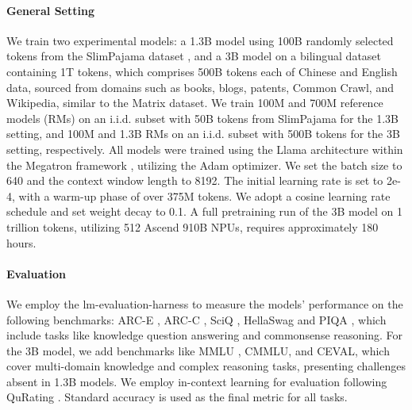 \documentclass[11pt]{article}
\begin{document}
\paragraph{General Setting} We train two experimental models: a 1.3B model using 100B randomly selected tokens from the SlimPajama dataset \cite{cerebras2023slimpajama}, and a 3B model on a bilingual dataset containing 1T tokens, which comprises 500B tokens each of Chinese and English data, sourced from domains such as books\cite{gao2020pile}, blogs\cite{baumgartner2020pushshift}, patents\cite{sharma2019bigpatent}, Common Crawl\cite{penedo2024fineweb}, and Wikipedia, similar to the Matrix dataset\cite{zhang2024mapneo}. We train 100M and 700M reference models (RMs) on an i.i.d. subset with 50B tokens from SlimPajama for the 1.3B setting, and 100M and 1.3B RMs on an i.i.d. subset with 500B tokens for the 3B setting, respectively. All models were trained using the Llama architecture\cite{touvron2023llama} within the Megatron framework \cite{shoeybi2019megatron}, utilizing the Adam optimizer. We set the batch size to 640 and the context window length to 8192. The initial learning rate is set to 2e-4, with a warm-up phase of over 375M tokens. We adopt a cosine learning rate schedule and set weight decay to 0.1. A full pretraining run of the 3B model on 1 trillion tokens, utilizing 512 Ascend 910B NPUs, requires approximately 180 hours.

\paragraph{Evaluation} We employ the lm-evaluation-harness \cite{gao2021framework} to measure the models' performance on the following benchmarks: ARC-E \cite{clark2018think}, ARC-C \cite{clark2018think}, SciQ \cite{welbl2017crowdsourcing}, HellaSwag \cite{zellers2019hellaswag} and PIQA \cite{bisk2020piqa}, which include tasks like knowledge question answering and commonsense reasoning. For the 3B model, we add benchmarks like MMLU \cite{hendrycks2020measuring}, CMMLU\cite{li2024cmmlumeasuringmassivemultitask}, and CEVAL\cite{huang2023cevalmultilevelmultidisciplinechinese}, which cover multi-domain knowledge and complex reasoning tasks, presenting challenges absent in 1.3B models.  We employ in-context learning for evaluation following QuRating \cite{wettig2024qurating}. Standard accuracy is used as the final metric for all tasks.
\end{document}
